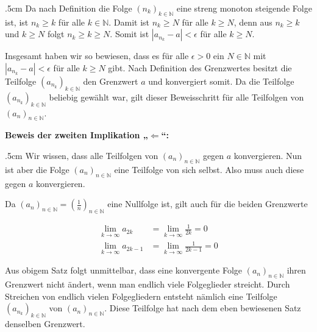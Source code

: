 \documentclass[fontsize=9pt,
               parskip=half-,
               DIV=14,
               listof=chapterentry,
               tocflat]{scrbook}
\newenvironment{indentblock}{\begin{adjustwidth}{.5cm}{}}{\end{adjustwidth}}
\newcommand{\proofstep}[1]{\textbf{\textcolor{sblau}{#1}}}
\begin{document}
\begin{proof*}
\begin{indentblock}
Da nach Definition die Folge $(n_{k})_{k\in \mathbb {N} }$ eine streng monoton steigende Folge ist, ist $n_{k}\geq k$ für alle $k\in \mathbb {N} $. Damit ist $n_{k}\geq N$ für alle $k\geq N$, denn aus $n_{k}\geq k$ und $k\geq N$ folgt $n_{k}\geq k\geq N$. Somit ist $\left|a_{n_{k}}-a\right|<\epsilon $ für alle $k\geq N$.

Insgesamt haben wir so bewiesen, dass es für alle $\epsilon >0$ ein $N\in \mathbb {N} $ mit $\left|a_{n_{k}}-a\right|<\epsilon $ für alle $k\geq N$ gibt. Nach Definition des Grenzwertes besitzt die Teilfolge $(a_{n_{k}})_{k\in \mathbb {N} }$ den Grenzwert $a$ und konvergiert somit. Da die Teilfolge $\left(a_{n_{k}}\right)_{k\in \mathbb {N} }$ beliebig gewählt war, gilt dieser Beweisschritt für alle Teilfolgen von $(a_{n})_{n\in \mathbb {N} }$.

\end{indentblock}

\proofstep{Beweis der zweiten Implikation „$\Leftarrow $“:}
 \begin{indentblock}
Wir wissen, dass alle Teilfolgen von $(a_{n})_{n\in \mathbb {N} }$ gegen $a$ konvergieren. Nun ist aber die Folge $(a_{n})_{n\in \mathbb {N} }$ eine Teilfolge von sich selbst. Also muss auch diese gegen $a$ konvergieren.

\end{indentblock}

\end{proof*}

\begin{example*}
Da $(a_{n})_{n\in \mathbb {N} }=\left({\tfrac {1}{n}}\right)_{n\in \mathbb {N} }$ eine Nullfolge ist, gilt auch für die beiden Grenzwerte

\begin{align*}
\lim _{k\to \infty }a_{2k}&=\lim _{k\to \infty }{\tfrac {1}{2k}}=0\\\lim _{k\to \infty }a_{2k-1}&=\lim _{k\to \infty }{\tfrac {1}{2k-1}}=0
\end{align*}

\end{example*}

\begin{hint*}
Aus obigem Satz folgt unmittelbar, dass eine konvergente Folge $(a_{n})_{n\in \mathbb {N} }$ ihren Grenzwert nicht ändert, wenn man endlich viele Folgeglieder streicht. Durch Streichen von endlich vielen Folgegliedern entsteht nämlich eine Teilfolge $(a_{n_{k}})_{k\in \mathbb {N} }$ von $(a_{n})_{n\in \mathbb {N} }$. Diese Teilfolge hat nach dem eben bewiesenen Satz denselben Grenzwert.

\end{hint*}
\end{document}
